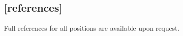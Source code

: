 \documentclass[a4paper]{res}
\begin{document}
\begin{resume}
\section{[references]} 

Full references for all positions are available upon request.


\end{resume}
\end{document}

